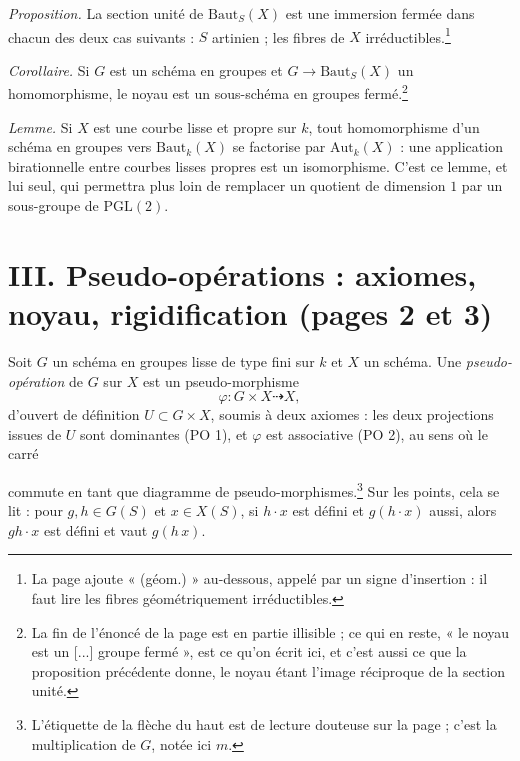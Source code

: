 \documentclass[11pt,a4paper]{article}
\begin{document}
\emph{Proposition.} La section unité de $\mathrm{Baut}_S(X)$ est une immersion
fermée dans chacun des deux cas suivants : $S$ artinien ; les fibres de $X$
irréductibles.\footnote{La page ajoute « (géom.) » au-dessous, appelé par un
signe d'insertion : il faut lire les fibres géométriquement irréductibles.}

\emph{Corollaire.} Si $G$ est un schéma en groupes et $G \to
\mathrm{Baut}_S(X)$ un homomorphisme, le noyau est un sous-schéma en groupes
fermé.\footnote{La fin de l'énoncé de la page est en partie illisible ; ce qui
en reste, « le noyau est un [...] groupe fermé », est ce qu'on écrit ici, et
c'est aussi ce que la proposition précédente donne, le noyau étant l'image
réciproque de la section unité.}

\emph{Lemme.} Si $X$ est une courbe lisse et propre sur $k$, tout homomorphisme
d'un schéma en groupes vers $\mathrm{Baut}_k(X)$ se factorise par
$\mathrm{Aut}_k(X)$ : une application birationnelle entre courbes lisses
propres est un isomorphisme. C'est ce lemme, et lui seul, qui permettra plus
loin de remplacer un quotient de dimension $1$ par un sous-groupe de
$\mathrm{PGL}(2)$.

\section*{III. Pseudo-opérations : axiomes, noyau, rigidification (pages 2 et 3)}

Soit $G$ un schéma en groupes lisse de type fini sur $k$ et $X$ un schéma. Une
\emph{pseudo-opération} de $G$ sur $X$ est un pseudo-morphisme
\[
  \varphi : G \times X \dashrightarrow X,
\]
d'ouvert de définition $U \subset G \times X$, soumis à deux axiomes : les deux
projections issues de $U$ sont dominantes (PO 1), et $\varphi$ est associative
(PO 2), au sens où le carré


commute en tant que diagramme de pseudo-morphismes.\footnote{L'étiquette de la
flèche du haut est de lecture douteuse sur la page ; c'est la multiplication de
$G$, notée ici $m$.} Sur les points, cela se lit : pour $g, h \in G(S)$ et $x
\in X(S)$, si $h \cdot x$ est défini et $g(h \cdot x)$ aussi, alors $gh \cdot
x$ est défini et vaut $g(h\,x)$.
\end{document}
